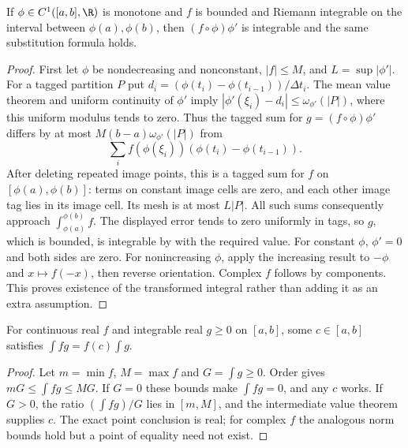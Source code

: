 \begin{theorem}
If $\phi\in C^1([a,b],\R)$ is monotone and $f$ is bounded and Riemann
integrable on the interval between $\phi(a),\phi(b)$, then
$(f\circ\phi)\phi'$ is integrable and the same substitution formula holds.
\end{theorem}
\begin{proof}
First let $\phi$ be nondecreasing and nonconstant, $|f|\le M$, and
$L=\sup|\phi'|$. For a tagged partition $P$ put
$d_i=(\phi(t_i)-\phi(t_{i-1}))/\Delta t_i$.
The mean value theorem and uniform continuity of $\phi'$ imply
$|\phi'(\xi_i)-d_i|\le\omega_{\phi'}(|P|)$, where this uniform
modulus tends to zero. Thus the tagged sum for $g=(f\circ\phi)\phi'$
differs by at most $M(b-a)\omega_{\phi'}(|P|)$ from
\[\sum_i f(\phi(\xi_i))(\phi(t_i)-\phi(t_{i-1})).\]
After deleting repeated image points, this is a tagged sum for $f$ on
$[\phi(a),\phi(b)]$: terms on constant image cells are zero, and each
other image tag lies in its image cell. Its mesh is at most $L|P|$.
All such sums consequently approach $\int_{\phi(a)}^{\phi(b)}f$.
The displayed error tends to zero uniformly in tags, so $g$, which is
bounded, is integrable by  with the
required value. For constant $\phi$, $\phi'=0$ and both sides are zero.
For nonincreasing $\phi$, apply the increasing result to $-\phi$ and
$x\mapsto f(-x)$, then reverse orientation. Complex $f$ follows by
components. This proves existence of the transformed integral rather
than adding it as an extra assumption.
\end{proof}

\begin{theorem}
For continuous real $f$ and integrable real $g\ge0$ on $[a,b]$, some
$c\in[a,b]$ satisfies $\int fg=f(c)\int g$.
\end{theorem}
\begin{proof}
Let $m=\min f$, $M=\max f$ and $G=\int g\ge0$.
Order gives $mG\le\int fg\le MG$. If $G=0$ these bounds make
$\int fg=0$, and any $c$ works. If $G>0$, the ratio $(\int fg)/G$
lies in $[m,M]$, and the intermediate value theorem supplies $c$.
The exact point conclusion is real; for complex $f$ the analogous
norm bounds hold but a point of equality need not exist.
\end{proof}

